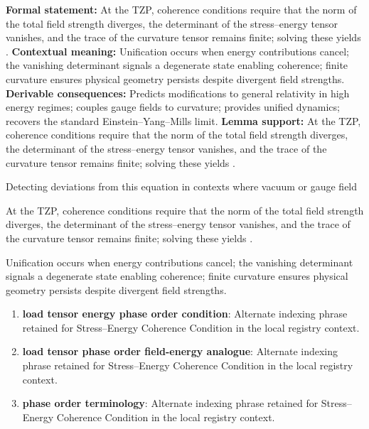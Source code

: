 \begingroup\footnotesize\setlength{\emergencystretch}{3em}\sloppy
\textbf{Formal statement:} At the TZP, coherence conditions require that the norm of the total field strength diverges, the determinant of the stress--energy tensor vanishes, and the trace of the curvature tensor remains finite; solving these yields .  
\textbf{Contextual meaning:} Unification occurs when energy contributions cancel; the vanishing determinant signals a degenerate state enabling coherence; finite curvature ensures physical geometry persists despite divergent field strengths.  
\textbf{Derivable consequences:} Predicts modifications to general relativity in high energy regimes; couples gauge fields to curvature; provides unified dynamics; recovers the standard Einstein--Yang--Mills limit.  
\textbf{Lemma support:} At the TZP, coherence conditions require that the norm of the total field strength diverges, the determinant of the stress--energy tensor vanishes, and the trace of the curvature tensor remains finite; solving these yields .  \par
\endgroup

Detecting deviations from this equation in contexts where vacuum or gauge field

At the TZP, coherence conditions require that the norm of the total field strength diverges, the determinant of the stress--energy tensor vanishes, and the trace of the curvature tensor remains finite; solving these yields .  

Unification occurs when energy contributions cancel; the vanishing determinant signals a degenerate state enabling coherence; finite curvature ensures physical geometry persists despite divergent field strengths.  
\endgroup

\begin{enumerate}[leftmargin=1.6em,itemsep=6pt,topsep=4pt]
\item \textbf{load tensor energy phase order condition}: Alternate indexing phrase retained for Stress--Energy Coherence Condition in the local registry context.
\item \textbf{load tensor phase order field-energy analogue}: Alternate indexing phrase retained for Stress--Energy Coherence Condition in the local registry context.
\item \textbf{phase order terminology}: Alternate indexing phrase retained for Stress--Energy Coherence Condition in the local registry context.
\end{enumerate}

